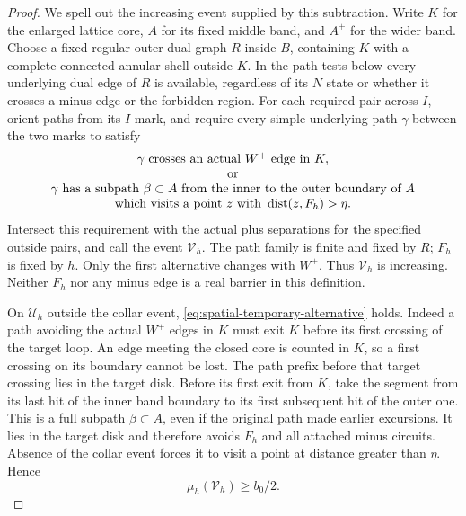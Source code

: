 \begin{proof}
We spell out the increasing event supplied by this subtraction.
Write $K$ for the enlarged lattice core, $A$ for its fixed middle
band, and $A^+$ for the wider band. Choose a fixed regular outer
dual graph $R$ inside $B$, containing $K$ with a complete connected
annular
shell outside $K$. In the path tests below every underlying dual
edge of $R$ is available, regardless of its $N$ state or whether
it crosses a minus edge or the forbidden region. For each required
pair across $I$, orient paths from its $I$ mark, and require every
simple underlying path $\gamma$ between the two marks to satisfy
\begin{equation}\label{eq:spatial-temporary-alternative}
 \begin{array}{c}
 \gamma\text{ crosses an actual }W^+\text{ edge in }K,\\
 \text{or}\\
 \gamma\text{ has a subpath }\beta\subset A
 \text{ from the inner to the outer boundary of }A\\
 \text{which visits a point }z\text{ with }\operatorname{dist}(z,F_h)>\eta .
 \end{array}
\end{equation}
Intersect this requirement with the actual plus separations for
the specified outside pairs, and call the event $\mathcal V_h$.
The path family is finite and fixed by $R$; $F_h$ is fixed by $h$.
Only the first alternative changes with $W^+$. Thus
$\mathcal V_h$ is increasing. Neither $F_h$ nor any minus edge is
a real barrier in this definition.

On $\mathcal U_h$ outside the collar event, \eqref{eq:spatial-temporary-alternative}
holds. Indeed a path avoiding the actual $W^+$ edges in $K$ must
exit $K$ before its first crossing of the target loop. An edge
meeting the closed core is counted in $K$, so a first crossing
on its boundary cannot be lost. The path prefix before that
target crossing lies in the target disk. Before its first exit
from $K$, take the segment from its last hit of the inner band
boundary to its first subsequent hit of the outer one. This is
a full subpath $\beta\subset A$, even if the original path made
earlier excursions. It lies in the target disk and therefore
avoids $F_h$ and all attached minus circuits. Absence of the
collar event forces it to visit a point at distance greater than
$\eta$. Hence
\begin{equation}\label{eq:spatial-temporary-probability}
                   \mu_h(\mathcal V_h)\ge b_0/2.
\end{equation}


\end{proof}
